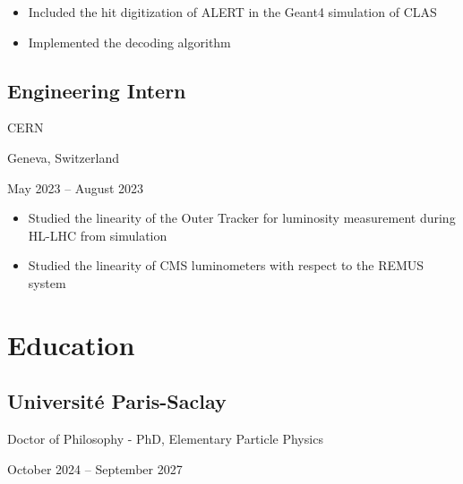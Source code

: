 \documentclass[10pt,a4paper]{article}
\begin{document}
\begin{itemize}[label=$\circ$, itemsep=1pt]
    \item Included the hit digitization of ALERT in the Geant4 simulation of CLAS
    \item Implemented the decoding algorithm
\end{itemize}


\subsection*{Engineering Intern}

\begin{minipage}{0.3\linewidth}
    CERN
\end{minipage}
\begin{minipage}{0.4\linewidth}
    \raggedright
    Geneva, Switzerland
\end{minipage}
\begin{minipage}{0.3\linewidth}
    \raggedleft
    May 2023 -- August 2023
\end{minipage}

\begin{itemize}[label=$\circ$, itemsep=1pt]
    \item Studied the linearity of the Outer Tracker for luminosity measurement during HL-LHC from simulation
    \item Studied the linearity of CMS luminometers with respect to the REMUS system
\end{itemize}




\section*{\centering Education}

\subsection*{Université Paris-Saclay}

\begin{minipage}{0.6\linewidth}
    Doctor of Philosophy - PhD, Elementary Particle Physics
\end{minipage}
\begin{minipage}{0.4\linewidth}
    \raggedleft
    October 2024 -- September 2027
\end{minipage}
\end{document}
